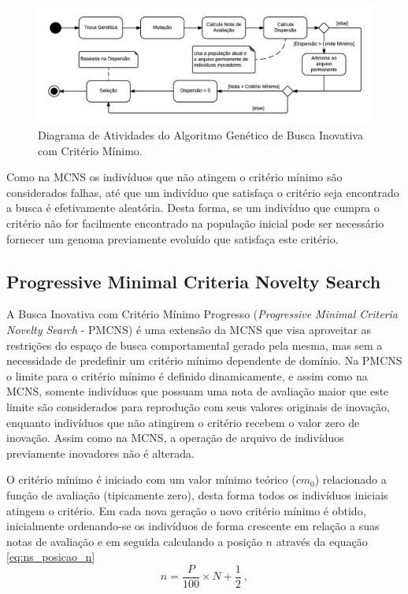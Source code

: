 \begin{figure}[htb]
	\begin{center}
		\includegraphics[width=1.0\textwidth]{Imagens/mcns_diag.png}
		\caption{Diagrama de Atividades do Algoritmo Genético de Busca Inovativa com Critério Mínimo.}
		\label{fig:mcns_diag}
	\end{center}
\end{figure}

Como na MCNS os indivíduos que não atingem o critério mínimo são considerados falhas, até que um indivíduo que satisfaça o critério seja encontrado a busca é efetivamente aleatória. Desta forma, se um indivíduo que cumpra o critério não for facilmente encontrado na população inicial pode ser necessário fornecer um genoma previamente evoluído que satisfaça este critério.

\subsection{Progressive Minimal Criteria Novelty Search}

A Busca Inovativa com Critério Mínimo Progresso (\emph{Progressive Minimal Criteria Novelty Search} - PMCNS) \cite{gomes2012progressive} é uma extensão da MCNS que visa aproveitar as restrições do espaço de busca comportamental gerado pela mesma, mas sem a necessidade de predefinir um critério mínimo dependente de domínio. Na PMCNS o limite para o critério mínimo é definido dinamicamente, e assim como na MCNS, somente indivíduos que possuam uma nota de avaliação maior que este limite são considerados para reprodução com seus valores originais de inovação, enquanto indivíduos que não atingirem o critério recebem o valor zero de inovação. Assim como na MCNS, a operação de arquivo de indivíduos previamente inovadores não é alterada.

O critério mínimo é iniciado com um valor mínimo teórico (${cm}_0$) relacionado a função de avaliação (tipicamente zero), desta forma todos os indivíduos iniciais atingem o critério. Em cada nova geração o novo critério mínimo é obtido, inicialmente ordenando-se os indivíduos de forma crescente em relação a suas notas de avaliação e em seguida calculando a posição $n$ através da equação \ref{eq:ns_posicao_n}
\begin{equation}
    n = \frac{P}{100} \times N + \frac{1}{2}~,
    \label{eq:ns_posicao_n}
\end{equation}

